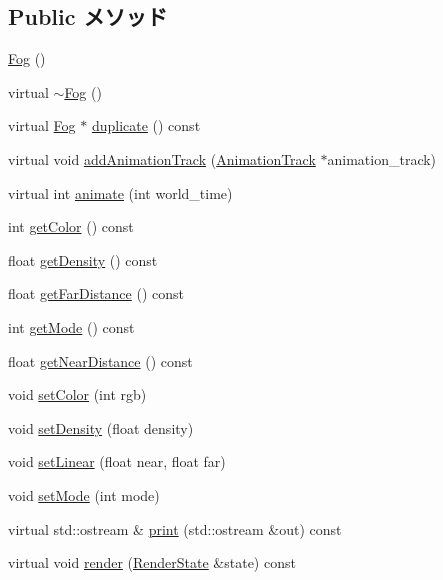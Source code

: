 \subsection*{Public メソッド}
\begin{CompactItemize}
\item 
\hyperlink{classm3g_1_1Fog_232ea9c5f5824d924fa185401fbfb234}{Fog} ()
\item 
virtual \hyperlink{classm3g_1_1Fog_c13d77e65284ed8f7480c8f83ed9780f}{$\sim$Fog} ()
\item 
virtual \hyperlink{classm3g_1_1Fog}{Fog} $\ast$ \hyperlink{classm3g_1_1Fog_d46dc959a547ee3a804fc871b83c0bbf}{duplicate} () const 
\item 
virtual void \hyperlink{classm3g_1_1Fog_415c0b110f95410ded9b85e5d99a496b}{addAnimationTrack} (\hyperlink{classm3g_1_1AnimationTrack}{AnimationTrack} $\ast$animation\_\-track)
\item 
virtual int \hyperlink{classm3g_1_1Fog_8aad1ceab4c2a03609c8a42324ce484d}{animate} (int world\_\-time)
\item 
int \hyperlink{classm3g_1_1Fog_4cfa1931c265ec3412fe3f6408a1b4f5}{getColor} () const 
\item 
float \hyperlink{classm3g_1_1Fog_31deef556a6aa5e519d3c79bd9c383c0}{getDensity} () const 
\item 
float \hyperlink{classm3g_1_1Fog_90df17252a921929fce6a5e92aed4021}{getFarDistance} () const 
\item 
int \hyperlink{classm3g_1_1Fog_d4ce4524e4751fe5e3cfb8c270347d54}{getMode} () const 
\item 
float \hyperlink{classm3g_1_1Fog_cd7a642e43bf99b0e1c5c24d3c6424a2}{getNearDistance} () const 
\item 
void \hyperlink{classm3g_1_1Fog_b1f5cc0f5cc6bbbd716a526c61f1081d}{setColor} (int rgb)
\item 
void \hyperlink{classm3g_1_1Fog_0ceeda25e326e99d6e971e980a00bd49}{setDensity} (float density)
\item 
void \hyperlink{classm3g_1_1Fog_a46fd556865ae7f1c683c3741b68c168}{setLinear} (float near, float far)
\item 
void \hyperlink{classm3g_1_1Fog_9f407b18ba6235cb96fa95611c1ea3a4}{setMode} (int mode)
\item 
virtual std::ostream \& \hyperlink{classm3g_1_1Fog_6fea17fa1532df3794f8cb39cb4f911f}{print} (std::ostream \&out) const 
\item 
virtual void \hyperlink{classm3g_1_1Fog_8babc8a79b78615da51161e94029eea9}{render} (\hyperlink{structm3g_1_1RenderState}{RenderState} \&state) const 
\end{CompactItemize}
